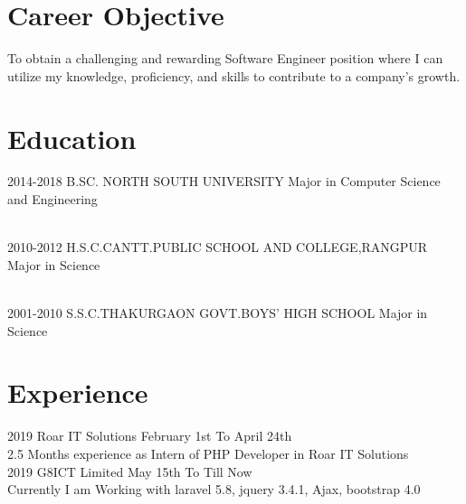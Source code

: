 \documentclass[]{cv-style}
\begin{document}
\section{Career Objective}
To obtain a challenging and rewarding Software Engineer position where I can utilize my knowledge, proficiency, and skills to contribute to a company's growth.
\section{Education}
\begin{entrylist}
  \entry
    {2014-2018} 
    {B.SC. NORTH SOUTH UNIVERSITY}
    {Major in Computer Science and Engineering}
    
  \\
  \entry
    {2010-2012}
    {H.S.C.CANTT.PUBLIC SCHOOL AND COLLEGE,RANGPUR}
    {Major in Science}
       
    \\
  \entry
    {2001-2010}
    {S.S.C.THAKURGAON GOVT.BOYS' HIGH SCHOOL}
    {Major in Science}
    
    
  
\end{entrylist}
\section{Experience}
\begin{entrylist}
\entry
  {2019}
  {Roar IT Solutions}
  {February 1st To April 24th}
  {\\
  2.5 Months experience as Intern of PHP Developer in Roar IT Solutions}
  \\
\entry
  {2019}
  {G8ICT Limited}
{May 15th To Till Now}
  {\\
 Currently I am  Working with laravel 5.8, jquery 3.4.1, Ajax, bootstrap 4.0}
\end{entrylist}

\end{document}
